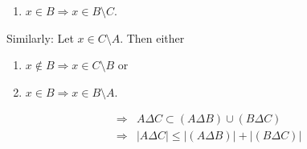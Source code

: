 \documentclass[10pt,a4paper,boxed]{hmcpset}
\begin{document}
\begin{solution}
\begin{enumerate}[(i)]
\begin{description}
\begin{enumerate}
								\item $x \in B \Rightarrow x \in B \setminus C$.
							\end{enumerate}
							Similarly: Let $x\in C \setminus A$. Then either
							\begin{enumerate}
								\item $x \notin B \Rightarrow x \in C \setminus B$ or
								\item $x \in B \Rightarrow x \in B \setminus A$.
							\end{enumerate}
							\begin{align*}
								\Rightarrow & A \Delta C \subset (A \Delta B) \cup (B \Delta C) \\
								\Rightarrow & \left\vert A \Delta C \right\vert \leq \left\vert (A \Delta B) \right\vert + \left\vert (B \Delta C) \right\vert
							\end{align*}
					\end{description}
			\end{enumerate}
		\end{solution}

	
\end{document}
